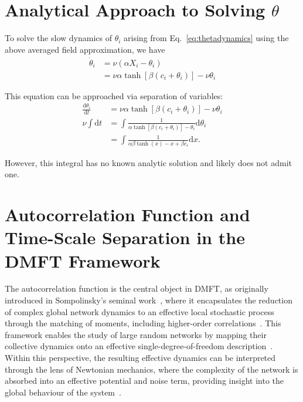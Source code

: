 \documentclass[reprint,amsmath,amssymb,aps]{revtex4-2}
\begin{document}
\section{Analytical Approach to Solving $\theta$}
To solve the slow dynamics of $\theta_i$ arising from Eq.~\eqref{eq:thetadynamics} using the above averaged field approximation, we have
\begin{align}
\label{eq:theta_final}
    \dot{\theta}_i &= \nu\left(\alpha X_i - \theta_i\right)  \nonumber \\
    &= \nu\alpha \tanh\left[\beta(c_i+\theta_i)\right] - \nu \theta_i 
\end{align}

This equation can be approached via separation of variables:
\begin{align*}
    \frac{\mathrm{d}\theta_i}{\mathrm{d}t}
    &= \nu\alpha \tanh\left[\beta(c_i+\theta_i)\right] - \nu \theta_i 
     \nonumber \\
    \nu \int\mathrm{d}t 
    &=
    \int\frac{1}{\alpha\tanh\left[\beta(c_i+\theta_i)\right]-\theta_i}\mathrm{d}\theta_i \nonumber \\
    &=
    \int\frac{1}{\alpha\beta\tanh\left(x\right)-x+\beta c_i}\mathrm{d}x.
\end{align*}

However, this integral has no known analytic solution and likely does not admit one.

\section{Autocorrelation Function and Time-Scale Separation in the DMFT Framework}\label{autocorelation}
The autocorrelation function is the central object in DMFT, as originally introduced in Sompolinsky’s seminal work~\cite{Sompolinsky1988,crisanti1987dynamics,panda2017chaos}, where it encapsulates the reduction of complex global network dynamics to an effective local stochastic process through the matching of moments, including higher-order correlations~\cite{Sompolinsky1988,crisanti1987dynamics,panda2017chaos,engelken2023lyapunov}. This framework enables the study of large random networks by mapping their collective dynamics onto an effective single-degree-of-freedom description~\cite{Smita,Sompolinsky1988,crisanti1987dynamics,panda2017chaos}. Within this perspective, the resulting effective dynamics can be interpreted through the lens of Newtonian mechanics, where the complexity of the network is absorbed into an effective potential and noise term, providing insight into the global behaviour of the system~\cite{Sompolinsky1988,crisanti1987dynamics,panda2017chaos}.
\end{document}
